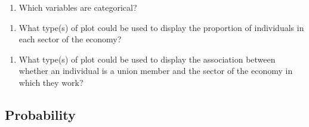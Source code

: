 \documentclass[
]{report}
\providecommand{\tightlist}{%
  \setlength{\itemsep}{0pt}\setlength{\parskip}{0pt}}
\begin{document}
\vspace{0.5in}

\begin{enumerate}
\def\labelenumi{\arabic{enumi}.}
\setcounter{enumi}{1}
\tightlist
\item
  Which variables are categorical?
\end{enumerate}

\vspace{1in}

\begin{enumerate}
\def\labelenumi{\arabic{enumi}.}
\setcounter{enumi}{2}
\tightlist
\item
  What type(s) of plot could be used to display the proportion of individuals in each sector of the economy?
\end{enumerate}

\vspace{1in}

\begin{enumerate}
\def\labelenumi{\arabic{enumi}.}
\setcounter{enumi}{3}
\tightlist
\item
  What type(s) of plot could be used to display the association between whether an individual is a union member and the sector of the economy in which they work?
\end{enumerate}

\vspace{1in}

\newpage

\hypertarget{probability}{%
\subsection{Probability}\label{probability}}
\end{document}
